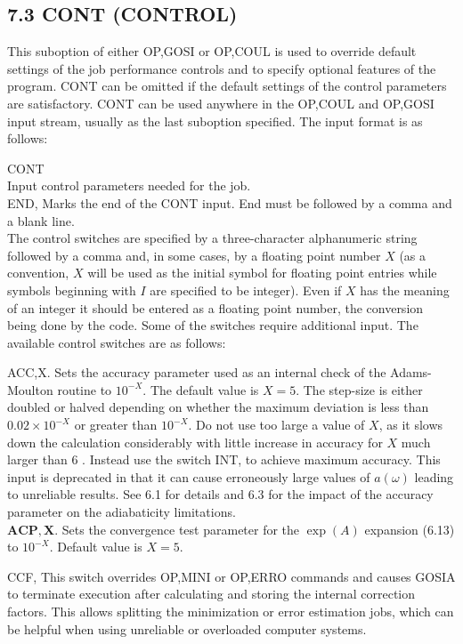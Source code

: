 \documentclass[10pt]{article}
\begin{document}
\subsection*{7.3 CONT (CONTROL)}
This suboption of either OP,GOSI or OP,COUL is used to override default settings of the job performance controls and to specify optional features of the program. CONT can be omitted if the default settings of the control parameters are satisfactory. CONT can be used anywhere in the OP,COUL and OP,GOSI input stream, usually as the last suboption specified. The input format is as follows:

CONT\\
Input control parameters needed for the job.\\
END, Marks the end of the CONT input. End must be followed by a comma and a blank line.\\
The control switches are specified by a three-character alphanumeric string followed by a comma and, in some cases, by a floating point number $X$ (as a convention, $X$ will be used as the initial symbol for floating point entries while symbols beginning with $I$ are specified to be integer). Even if $X$ has the meaning of an integer it should be entered as a floating point number, the conversion being done by the code. Some of the switches require additional input. The available control switches are as follows:

ACC,X. Sets the accuracy parameter used as an internal check of the Adams-Moulton routine to $10^{-X}$. The default value is $X=5$. The step-size is either doubled or halved depending on whether the maximum deviation is less than $0.02 \times 10^{-X}$ or greater than $10^{-X}$. Do not use too large a value of $X$, as it slows down the calculation considerably with little increase in accuracy for $X$ much larger than 6 . Instead use the switch INT, to achieve maximum accuracy. This input is deprecated in that it can cause erroneously large values of $a(\omega)$ leading to unreliable results. See 6.1 for details and 6.3 for the impact of the accuracy parameter on the adiabaticity limitations.\\
$\mathbf{A C P}, \mathbf{X}$. Sets the convergence test parameter for the $\exp (A)$ expansion (6.13) to $10^{-X}$. Default value is $X=5$.

CCF, This switch overrides OP,MINI or OP,ERRO commands and causes GOSIA to terminate execution after calculating and storing the internal correction factors. This allows splitting the minimization or error estimation jobs, which can be helpful when using unreliable or overloaded computer systems.
\end{document}
